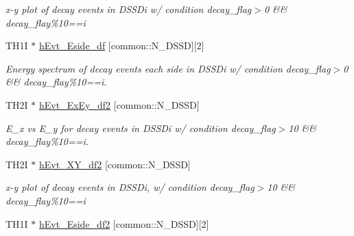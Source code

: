 \begin{DoxyCompactItemize}
\begin{DoxyCompactList}\small\item\em x-\/y plot of decay events in D\-S\-S\-Di w/ condition decay\-\_\-flag$>$0 \&\& decay\-\_\-flay\%10==i \end{DoxyCompactList}\item 
\hypertarget{classAnalysis_a5e0bfb34d214bf5288f1e3ffe30c3c5e}{T\-H1\-I $\ast$ \hyperlink{classAnalysis_a5e0bfb34d214bf5288f1e3ffe30c3c5e}{h\-Evt\-\_\-\-Eside\-\_\-df} \mbox{[}common\-::\-N\-\_\-\-D\-S\-S\-D\mbox{]}\mbox{[}2\mbox{]}}\label{classAnalysis_a5e0bfb34d214bf5288f1e3ffe30c3c5e}

\begin{DoxyCompactList}\small\item\em Energy spectrum of decay events each side in D\-S\-S\-Di w/ condition decay\-\_\-flag$>$0 \&\& decay\-\_\-flay\%10==i. \end{DoxyCompactList}\item 
\hypertarget{classAnalysis_aac1b1b474b7cacc19121ff5f6df9e12b}{T\-H2\-I $\ast$ \hyperlink{classAnalysis_aac1b1b474b7cacc19121ff5f6df9e12b}{h\-Evt\-\_\-\-Ex\-Ey\-\_\-df2} \mbox{[}common\-::\-N\-\_\-\-D\-S\-S\-D\mbox{]}}\label{classAnalysis_aac1b1b474b7cacc19121ff5f6df9e12b}

\begin{DoxyCompactList}\small\item\em E\-\_\-x vs E\-\_\-y for decay events in D\-S\-S\-Di w/ condition decay\-\_\-flag$>$10 \&\& decay\-\_\-flay\%10==i. \end{DoxyCompactList}\item 
\hypertarget{classAnalysis_a3074ffeab2f089d27c97a3d1929e0c17}{T\-H2\-I $\ast$ \hyperlink{classAnalysis_a3074ffeab2f089d27c97a3d1929e0c17}{h\-Evt\-\_\-\-X\-Y\-\_\-df2} \mbox{[}common\-::\-N\-\_\-\-D\-S\-S\-D\mbox{]}}\label{classAnalysis_a3074ffeab2f089d27c97a3d1929e0c17}

\begin{DoxyCompactList}\small\item\em x-\/y plot of decay events in D\-S\-S\-Di, w/ condition decay\-\_\-flag$>$10 \&\& decay\-\_\-flay\%10==i \end{DoxyCompactList}\item 
\hypertarget{classAnalysis_a3af5458ed02295c09ec9427b80ee0537}{T\-H1\-I $\ast$ \hyperlink{classAnalysis_a3af5458ed02295c09ec9427b80ee0537}{h\-Evt\-\_\-\-Eside\-\_\-df2} \mbox{[}common\-::\-N\-\_\-\-D\-S\-S\-D\mbox{]}\mbox{[}2\mbox{]}}\label{classAnalysis_a3af5458ed02295c09ec9427b80ee0537}


\end{DoxyCompactItemize}
